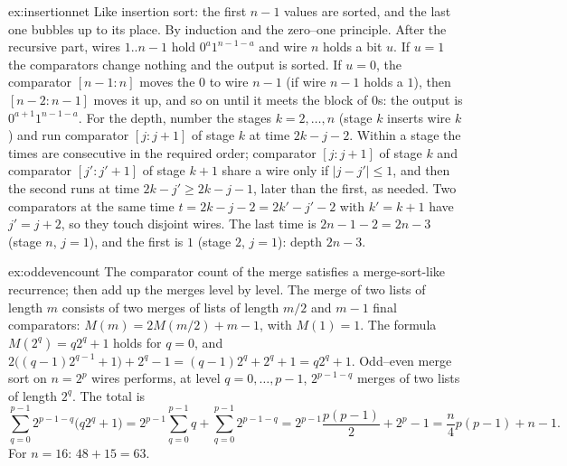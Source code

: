 \begin{solution}{ex:insertionnet}
\idea Like insertion sort: the first $n-1$ values are sorted, and the last one bubbles up to its place.
\writeup By induction and the zero--one principle. After the recursive part, wires $1..n-1$ hold $0^a1^{n-1-a}$ and wire $n$ holds a bit $u$. If $u=1$ the comparators change nothing and the output is
sorted. If $u=0$, the comparator $[n-1:n]$ moves the $0$ to wire $n-1$ (if wire $n-1$ holds a $1$), then $[n-2:n-1]$ moves it up, and so on until it meets the block of $0$s: the output is
$0^{a+1}1^{n-1-a}$. For the depth, number the stages $k=2,\dots,n$ (stage $k$ inserts wire $k$) and run comparator $[j:j+1]$ of stage $k$ at time $2k-j-2$. Within a stage the times are
consecutive in the required order; comparator $[j:j+1]$ of stage $k$ and comparator $[j':j'+1]$ of stage $k+1$ share a wire only if $|j-j'|\le1$, and then the second runs at time
$2k-j'\ge2k-j-1$, later than the first, as needed. Two comparators at the same time $t=2k-j-2=2k'-j'-2$ with $k'=k+1$ have $j'=j+2$, so they touch disjoint wires. The last time is
$2n-1-2=2n-3$ (stage $n$, $j=1$), and the first is $1$ (stage $2$, $j=1$): depth $2n-3$.
\end{solution}

\begin{solution}{ex:oddevencount}
\idea The comparator count of the merge satisfies a merge-sort-like recurrence; then add up the merges level by level.
\writeup The merge of two lists of length $m$ consists of two merges of lists of length $m/2$ and $m-1$ final comparators: $M(m)=2M(m/2)+m-1$, with $M(1)=1$. The formula $M(2^q)=q2^q+1$ holds for $q=0$,
and $2\bigl((q-1)2^{q-1}+1\bigr)+2^q-1=(q-1)2^q+2^q+1=q2^q+1$. Odd--even merge sort on $n=2^p$ wires performs, at level $q=0,\dots,p-1$, $2^{p-1-q}$ merges of two lists of length $2^q$. The total is
\[
\sum_{q=0}^{p-1}2^{p-1-q}\bigl(q2^q+1\bigr)=2^{p-1}\sum_{q=0}^{p-1}q+\sum_{q=0}^{p-1}2^{p-1-q}=2^{p-1}\frac{p(p-1)}2+2^p-1=\frac n4p(p-1)+n-1.
\]
For $n=16$: $48+15=63$.
\end{solution}

